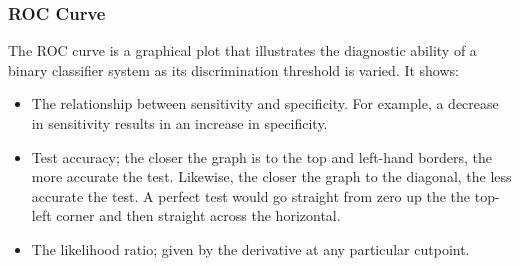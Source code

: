 \documentclass[english]{latex4ei/latex4ei_sheet}
\begin{document}
\begin{sectionbox}
\subsubsection{ROC Curve}
The ROC curve is a graphical plot that illustrates the diagnostic ability of a binary classifier system as its discrimination threshold is varied. It shows:
\begin{itemize}
    \item The relationship between sensitivity and specificity. For example, a decrease in sensitivity results in an increase in specificity.
    \item Test accuracy; the closer the graph is to the top and left-hand borders, the more accurate the test. Likewise, the closer the graph to the diagonal, the less accurate the test. A perfect test would go straight from zero up the the top-left corner and then straight across the horizontal.
    \item The likelihood ratio; given by the derivative at any particular cutpoint.
\end{itemize}
\end{sectionbox}
\end{document}
